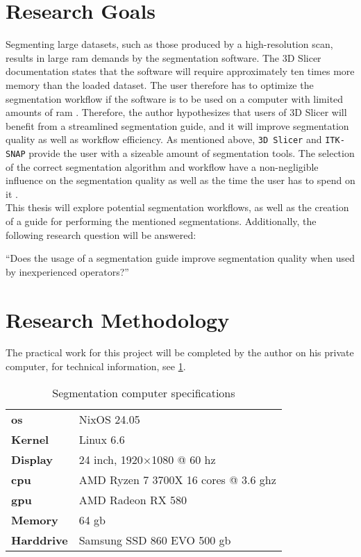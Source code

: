 \section{Research Goals}\label{s:introduction-researchgoals}
Segmenting large datasets, such as those produced by a high-resolution \mct\space scan, results in large \acrfull{ram} demands by the segmentation software.
The 3D Slicer documentation states that the software will require approximately ten times more memory than the loaded dataset.
The user therefore has to optimize the segmentation workflow if the software is to be used on a computer with limited amounts of \acrshort{ram} \cite{slicercommunity3DSlicerImage2022,fedorov3DSlicerImage2012}.
Therefore, the author hypothesizes that users of 3D Slicer will benefit from a streamlined segmentation guide, and it will improve segmentation quality as well as workflow efficiency.
As mentioned above, \texttt{3D Slicer} and \texttt{ITK-SNAP} provide the user with a sizeable amount of segmentation tools.
The selection of the correct segmentation algorithm and workflow have a non-negligible influence on the segmentation quality as well as the time the user has to spend on it \cite{liuSAMMSegmentAny2023}.\\
This thesis will explore potential segmentation workflows, as well as the creation of a guide for performing the mentioned segmentations.
Additionally, the following research question will be answered:
\begin{displayquote}
	``Does the usage of a segmentation guide improve segmentation quality when used by inexperienced operators?''
\end{displayquote}


\section{Research Methodology}\label{s:introduction-researchmethodology}
The practical work for this project will be completed by the author on his private computer, for technical information, see \cref{t:computer-specs}.
\begin{table}[ht]
	\centering
	\begin{tabular}{l l}
		\textbf{\acrshort{os}}  & NixOS 24.05                                     \\
		\textbf{Kernel}         & Linux 6.6                                       \\
		\textbf{Display}        & 24 inch, 1920$\times$1080 @ 60 \acrshort{hz}    \\
		\textbf{\acrshort{cpu}} & AMD Ryzen 7 3700X 16 cores @ 3.6 \acrshort{ghz} \\
		\textbf{\acrshort{gpu}} & AMD Radeon RX 580                               \\
		\textbf{Memory}         & 64 \acrshort{gb}                                \\
		\textbf{Harddrive}      & Samsung SSD 860 EVO 500 \acrshort{gb}
	\end{tabular}
	\caption{Segmentation computer specifications}\label{t:computer-specs}
\end{table}

